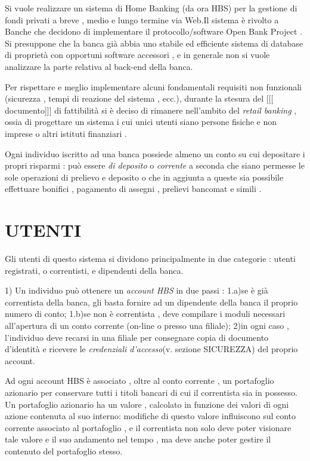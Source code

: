 Si vuole realizzare un sistema di Home Banking (da ora HBS) per la gestione di fondi privati a breve , medio e lungo termine via Web.Il sistema è rivolto a Banche che decidono di implementare il protocollo/software Open Bank Project . Si presuppone che la banca già abbia uno stabile ed efficiente sistema di database di proprietà con opportuni software accessori , e in generale non si vuole analizzare la parte relativa al back-end della banca.  

Per rispettare e meglio implementare alcuni fondamentali requisiti non funzionali (sicurezza , tempi di reazione del sistema , ecc.), durante la stesura del [[[ documento]]] di fattibilità si è deciso di rimanere nell'ambito del \emph{retail banking} , ossia di progettare un sistema i cui unici utenti siano persone fisiche e non imprese o altri istituti finanziari .

Ogni individuo iscritto ad una banca possiede almeno un conto su cui depositare i propri risparmi : può essere \emph{di deposito} o \emph{corrente} a seconda che siano permesse le sole operazioni di prelievo e deposito o che in aggiunta a queste sia possibile  effettuare bonifici , pagamento di assegni , prelievi bancomat e simili .

\section{UTENTI}

Gli utenti di questo sistema si dividono principalmente in due categorie : utenti registrati, o correntisti,  e dipendenti della banca. 

1) Un individuo può ottenere un \emph{account HBS} in due passi :   
	1.a)se è già correntista della banca, gli basta fornire ad un dipendente della banca il proprio numero di conto;
	1.b)se non è correntista , deve compilare i moduli necessari all'apertura di un conto corrente (on-line o presso una filiale);
	2)in ogni caso , l'individuo deve recarsi in una filiale per consegnare copia di documento d'identità e ricevere le 					\emph{credenziali d'accesso}(v. sezione SICUREZZA) del proprio account.

Ad ogni account HBS è associato , oltre al conto corrente , un portafoglio azionario per conservare tutti i titoli bancari di cui il correntista sia in possesso. Un portafoglio azionario ha un valore , calcolato in funzione dei valori di ogni azione contenuta al suo interno: modifiche di questo valore influiscono sul conto corrente associato al portafoglio , e il correntista non solo deve poter visionare tale valore e il suo andamento nel tempo , ma deve anche poter gestire il contenuto del portafoglio stesso.


